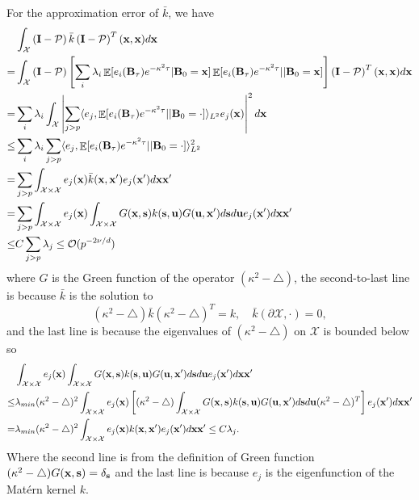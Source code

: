 \documentclass[aos,preprint]{imsart}
\theoremstyle{plain}
\DeclareMathOperator{\E}{\mathbb E}
\newcommand{\CalO}{\mathcal O}
\newcommand{\CalX}{\mathcal X}
\newcommand{\CalP}{\mathcal P}
\newcommand{\BI}{\bold I}
\newcommand{\Bx}{\bold x}
\newcommand{\Bs}{\bold s}
\newcommand{\BFx}{\bold x}
\newcommand{\BB}{\bold B}
\newcommand{\Bu}{\bold u}
\theoremstyle{remark}
\begin{document}
\begin{appendix}
For the approximation error of $\bar{k}$, we have
\begin{align*}
    &\int_\CalX\left(\BI-\CalP\right)\bar{k}\left(\BI-\CalP\right)^T(\Bx,\Bx)d\Bx\\
    =&\int_\CalX\left(\BI-\CalP\right)\left[\sum_i\lambda_i\E[e_i(\BB_\tau)e^{-\kappa^2\tau}|\BB_0=\BFx]\E[e_i(\BB_\tau)e^{-\kappa^2\tau}||\BB_0=\BFx]\right]\left(\BI-\CalP\right)^T(\Bx,\Bx)d\Bx\\
    =& \sum_i\lambda_i \int_\CalX\left|\sum_{j>p} \langle e_j, \E[e_i(\BB_\tau)e^{-\kappa^2\tau}||\BB_0=\cdot]\rangle_{L^2}e_j(\BFx)\right|^2d\BFx\\
    \leq &\sum_i\lambda_i \sum_{j>p} \langle e_j, \E[e_i(\BB_\tau)e^{-\kappa^2\tau}||\BB_0=\cdot]\rangle_{L^2}^2\\
    =& \sum_{j>p} \int_{\CalX\times\CalX} e_j(\BFx)\bar{k}(\BFx,\BFx')e_j(\BFx')d\BFx\BFx'\\
    =& \sum_{j>p} \int_{\CalX\times\CalX} e_j(\BFx)\int_{\CalX\times\CalX}G(\BFx,\Bs)k(\Bs,\Bu)G(\Bu,\Bx')d\Bs d\Bu e_j(\BFx')d\BFx\BFx'\\
    \leq & C\sum_{j>p}\lambda_j\leq \CalO(p^{-2\nu/d})
\end{align*}
where $G$ is the Green function of the operator $(\kappa^2-\bigtriangleup)$, the second-to-last line is because $\bar{k}$ is the solution to 
\[(\kappa^2-\bigtriangleup)\bar{k}(\kappa^2-\bigtriangleup)^T=k, \quad \bar{k}(\partial\CalX,\cdot)=0,\]
and the last line is because the eigenvalues of $(\kappa^2-\bigtriangleup)$ on $\CalX$ is bounded below so
\begin{align}
    &\int_{\CalX\times\CalX} e_j(\BFx)\int_{\CalX\times\CalX}G(\BFx,\Bs)k(\Bs,\Bu)G(\Bu,\Bx')d\Bs d\Bu e_j(\BFx')d\BFx\BFx'\nonumber\\
    \leq & \lambda_{min}(\kappa^2-\bigtriangleup) ^2\int_{\CalX\times\CalX} e_j(\BFx)\left[(\kappa^2-\bigtriangleup)\int_{\CalX\times\CalX}G(\BFx,\Bs)k(\Bs,\Bu)G(\Bu,\Bx')d\Bs d\Bu(\kappa^2-\bigtriangleup)^T\right]  e_j(\BFx')d\BFx\BFx'\nonumber\\
    = & \lambda_{min}(\kappa^2-\bigtriangleup)^2\int_{\CalX\times\CalX} e_j(\BFx) k(\Bx,\Bx') e_j(\BFx')d\BFx\BFx'\leq C\lambda_j.\label{eq:mat_eigen_regression_1}
\end{align}
Where the second line is from the definition of Green function $(\kappa^2-\bigtriangleup)G(\BFx,\Bs)=\delta_\Bs$ and the last line is because $e_j$ is the eigenfunction of the Mat\'ern kernel $k$.


\end{appendix}
\end{document}
